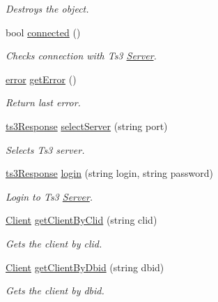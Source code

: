 \begin{DoxyCompactItemize}
\begin{DoxyCompactList}\small\item\em Destroys the object. \end{DoxyCompactList}\item 
bool \hyperlink{class_ts3_api_1_1_server_a947c45de5db2315434a42db1bf024c4c}{connected} ()
\begin{DoxyCompactList}\small\item\em Checks connection with Ts3 \hyperlink{class_ts3_api_1_1_server}{Server}. \end{DoxyCompactList}\item 
\hyperlink{struct_ts3_api_1_1error}{error} \hyperlink{class_ts3_api_1_1_server_aaf8438c60bf85b8859d2f3cf2c0ae394}{get\+Error} ()
\begin{DoxyCompactList}\small\item\em Return last error. \end{DoxyCompactList}\item 
\hyperlink{struct_ts3_api_1_1ts3_response}{ts3\+Response} \hyperlink{class_ts3_api_1_1_server_aa7baa3564ee6d2233f9e9a7f21852b03}{select\+Server} (string port)
\begin{DoxyCompactList}\small\item\em Selects Ts3 server. \end{DoxyCompactList}\item 
\hyperlink{struct_ts3_api_1_1ts3_response}{ts3\+Response} \hyperlink{class_ts3_api_1_1_server_a23702c6673e012c75f5ad884dbc90d4d}{login} (string login, string password)
\begin{DoxyCompactList}\small\item\em Login to Ts3 \hyperlink{class_ts3_api_1_1_server}{Server}. \end{DoxyCompactList}\item 
\hyperlink{class_ts3_api_1_1_client}{Client} \hyperlink{class_ts3_api_1_1_server_a99295e7a116284d1622c7313b3a50977}{get\+Client\+By\+Clid} (string clid)
\begin{DoxyCompactList}\small\item\em Gets the client by clid. \end{DoxyCompactList}\item 
\hyperlink{class_ts3_api_1_1_client}{Client} \hyperlink{class_ts3_api_1_1_server_a29d600f140df9d30158b29ab649c6ec8}{get\+Client\+By\+Dbid} (string dbid)
\begin{DoxyCompactList}\small\item\em Gets the client by dbid. \end{DoxyCompactList}\item 

\end{DoxyCompactItemize}
